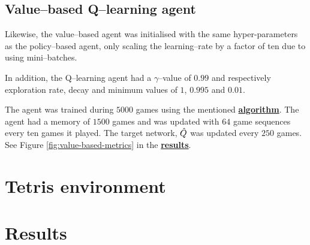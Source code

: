 \documentclass{article}
\let\oldhyperlink\hyperlink
\renewcommand{\hyperlink}[2]{\oldhyperlink{#1}{\textbf{#2}}}
\renewenvironment{leftbar}[1][\hsize]{
    \def\FrameCommand{{\color{barcolor}\vrule width 0.5pt \hspace{10pt}}}
    \MakeFramed{\hsize#1 \advance\hsize-\width \FrameRestore}
}{\endMakeFramed}
\begin{document}
\subsection*{Value–based Q–learning agent}
\begin{leftbar}
    Likewise, the value–based agent was initialised with the same hyper-parameters as the policy–based agent, only scaling the learning–rate by a factor of ten due to using mini–batches.

    In addition, the Q–learning agent had a $\gamma$–value of $0.99$ and respectively exploration rate, decay and minimum values of $1$, $0.995$ and $0.01$.

    The agent was trained during $5 000$ games using the mentioned \hyperlink{alg:dqn}{algorithm}. The agent had a memory of $1 500$ games and was updated with $64$ game sequences every ten games it played. The target network, $\Hat{Q}$ was updated every $250$ games. See Figure \ref{fig:value-based-metrics} in the \hyperlink{sec:results}{results}.
\end{leftbar}

\hypertarget{seq:tetris}{}
\section*{Tetris environment}

\newpage
\printbibliography

\newpage
\hypertarget{sec:results}{}
\section*{Results}
\end{document}
